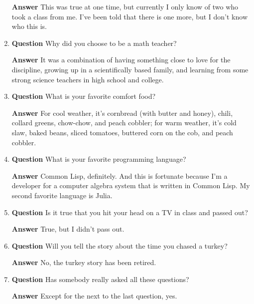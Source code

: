 \documentclass[12pt]{article}
\newcounter{ex}\setcounter{ex}{0}
\newcounter{dy}\setcounter{dy}{0}
\begin{document}
\begin{enumerate}
 \textbf{Answer}  This was  true at one time, but currently I only know of two who took a class from me. I've been told that there is one more, but I don't know who this is.

\item  \textbf{Question} Why did you choose to be a math teacher?

\textbf{Answer} It was a combination of having something close to love for the discipline, growing up in a scientifically based family, and learning from some strong science teachers in high school and college.


\item  \textbf{Question} What is your favorite comfort food?

  \textbf{Answer}  For cool weather, it's cornbread (with butter and honey), chili, collard greens, chow-chow, and peach cobbler; for warm weather, it's cold slaw, baked beans, sliced tomatoes, buttered corn on the cob, and peach cobbler.

\item   \textbf{Question}  What is your favorite programming language?

 \textbf{Answer}  Common Lisp, definitely. And this is fortunate because I'm a developer for a computer algebra system that is written in Common Lisp. My second favorite language is Julia.

\item   \textbf{Question} Is it true that you hit your head on a TV in class and 
passed out?

  \textbf{Answer} True, but I didn't pass out.

\item   \textbf{Question} Will you tell the story about the time you chased a turkey?

 \textbf{Answer} No, the turkey story has been retired.

\item \textbf{Question} Has somebody really asked all these questions?

  \textbf{Answer}  Except for the next to the last question, yes.
\end{enumerate}
\end{document}
